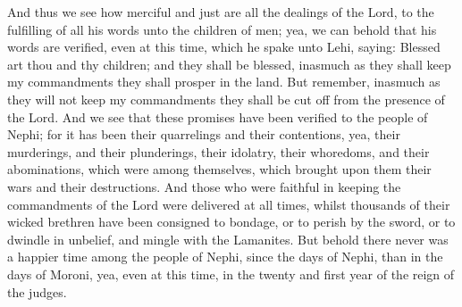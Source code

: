 \bverse \iffalse And thus we see how merciful and just are all the dealings of the Lord, to the fulfilling of all his words unto the children of men; yea, we can behold that his words are verified, even at this time, which he spake unto Lehi, saying: \fi
And thus we see how merciful and just are all the dealings of the Lord, to the fulfilling of all his words unto the children of men; yea, we can behold that his words are verified, even at this time, which he spake unto Lehi, saying:
\bverse \iffalse Blessed art thou and thy children; and they shall be blessed, inasmuch as they shall keep my commandments they shall prosper in the land.  But remember, inasmuch as they will not keep my commandments they shall be cut off from the presence of the Lord. \fi
Blessed art thou and thy children; and they shall be blessed, inasmuch as they shall keep my commandments they shall prosper in the land.  But remember, inasmuch as they will not keep my commandments they shall be cut off from the presence of the Lord.
\bverse \iffalse And we see that these promises have been verified to the people of Nephi; for it has been their quarrelings and their contentions, yea, their murderings, and their plunderings, their idolatry, their whoredoms, and their abominations, which were among themselves, which brought upon them their wars and their destructions. \fi
And we see that these promises have been verified to the people of Nephi; for it has been their quarrelings and their contentions, yea, their murderings, and their plunderings, their idolatry, their whoredoms, and their abominations, which were among themselves, which brought upon them their wars and their destructions.
\bverse \iffalse And those who were faithful in keeping the commandments of the Lord were delivered at all times, whilst thousands of their wicked brethren have been consigned to bondage, or to perish by the sword, or to dwindle in unbelief, and mingle with the Lamanites. \fi
And those who were faithful in keeping the commandments of the Lord were delivered at all times, whilst thousands of their wicked brethren have been consigned to bondage, or to perish by the sword, or to dwindle in unbelief, and mingle with the Lamanites.
\bverse \iffalse But behold there never was a happier time among the people of Nephi, since the days of Nephi, than in the days of Moroni, yea, even at this time, in the twenty and first year of the reign of the judges. \fi
But behold there never was a happier time among the people of Nephi, since the days of Nephi, than in the days of Moroni, yea, even at this time, in the twenty and first year of the reign of the judges.
